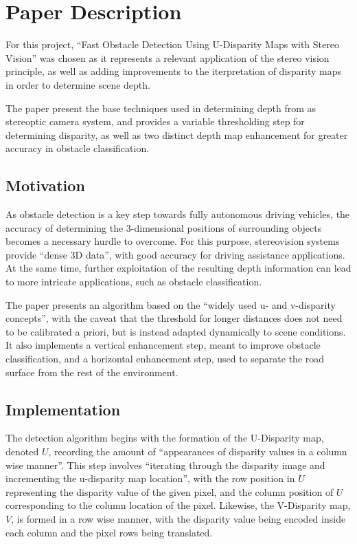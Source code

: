 \section{Paper Description}

For this project, ``Fast Obstacle Detection Using U-Disparity Maps with Stereo Vision'' was chosen
as it represents a relevant application of the stereo vision principle, as well as adding improvements
to the iterpretation of disparity maps in order to determine scene depth.

The paper present the base techniques used in determining depth from as stereoptic camera system, and
provides a variable thresholding step for determining disparity, as well as two distinct depth map 
enhancement for greater accuracy in obstacle classification.

\subsection{Motivation}

As obstacle detection is a key step towards fully autonomous driving vehicles, the accuracy of determining
the 3-dimensional positions of surrounding objects becomes a necessary hurdle to overcome. For this purpose,
stereovision systems provide ``dense 3D data'', with good accuracy for driving assistance applications. At
the same time, further exploitation of the resulting depth information can lead to more intricate 
applications, such as obstacle classification.~\cite{withMain}

The paper presents an algorithm based on the ``widely used u- and v-disparity concepts'', with the caveat
that the threshold for longer distances does not need to be calibrated a priori, but is instead adapted
dynamically to scene conditions. It also implements a vertical enhancement step, meant to improve obstacle
classification, and a horizontal enhancement step, used to separate the road surface from the rest of the
environment.~\cite{withMain}

\subsection{Implementation}

The detection algorithm begins with the formation of the U-Disparity map, denoted \(U\), recording the amount 
of ``appearances of disparity values in a column wise manner''.  This step involves ``iterating through the
disparity image and incrementing the u-disparity map location'', with the row position in \(U\) representing
the disparity value of the given pixel, and the column position of \(U\) corresponding to the column location 
of the pixel. Likewise, the V-Disparity map, \(V\), is formed in a row wise manner, with the disparity value
being encoded inside each column and the pixel rows being translated.~\cite{withMain}

